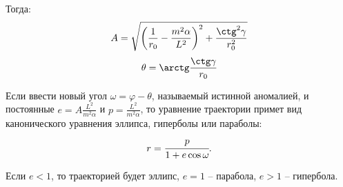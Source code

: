 Тогда:
\[
    A = 
        \sqrt{\left
        (\frac{1}{r_0} -  \frac{m^2 \alpha}{ L^2}
        \right)^2+
        \frac{ \ctg^2 \gamma}{ r_0^2}}
\]   
\[
    \theta = \arctg\frac{\ctg\gamma}{r_0}
\]   

Если ввести новый угол \( \omega = \varphi - \theta \), называемый истинной
аномалией, и постоянные \( e = A\frac{L^2}{m^2 \alpha} \) и
\( p = \frac{L^2}{m^2 \alpha} \), то уравнение траектории примет вид
канонического уравнения эллипса, гиперболы или параболы:
\[
    r = \cfrac{p}{1+e \cos \omega}.
\]   

Если \( e < 1 \), то траекторией будет эллипс, \( e = 1 \) -- парабола,
\( e > 1 \) -- гипербола.

\newpage
